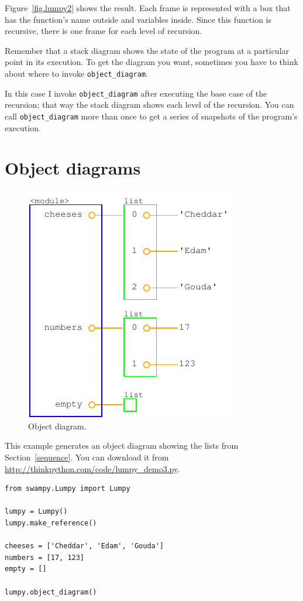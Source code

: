 \documentclass[10pt]{book}
\begin{document}
Figure~\ref{fig.lumpy2} shows the result.  Each frame is represented
with a box that has the function's name outside and variables inside.
Since this function is recursive, there is one frame for each
level of recursion.

Remember that a stack diagram shows the state of the program at
a particular point in its execution.  To get the diagram you want,
sometimes you have to think about where to invoke \verb"object_diagram".

In this case I invoke \verb"object_diagram" after executing the base
case of the recursion; that way the stack diagram shows each level of
the recursion.  You can call \verb"object_diagram" more than once to
get a series of snapshots of the program's execution.


\section{Object diagrams}

\begin{figure}
\centerline
{\includegraphics[scale=0.7]{figs/lumpydemo3.pdf}}
\caption{Object diagram.}
\label{fig.lumpy3}
\end{figure}

This example generates an object diagram showing the lists from
Section~\ref{sequence}.  You can download it from
\url{http://thinkpython.com/code/lumpy_demo3.py}.
 

\begin{verbatim}
from swampy.Lumpy import Lumpy

lumpy = Lumpy()
lumpy.make_reference()

cheeses = ['Cheddar', 'Edam', 'Gouda']
numbers = [17, 123]
empty = []

lumpy.object_diagram()
\end{verbatim}
\end{document}
